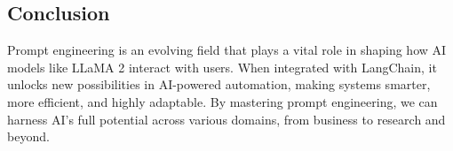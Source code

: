 \subsection{Conclusion}
Prompt engineering is an evolving field that plays a vital role in shaping how AI models like LLaMA 2 interact with users. When integrated with LangChain, it unlocks new possibilities in AI-powered automation, making systems smarter, more efficient, and highly adaptable. By mastering prompt engineering, we can harness AI’s full potential across various domains, from business to research and beyond.





